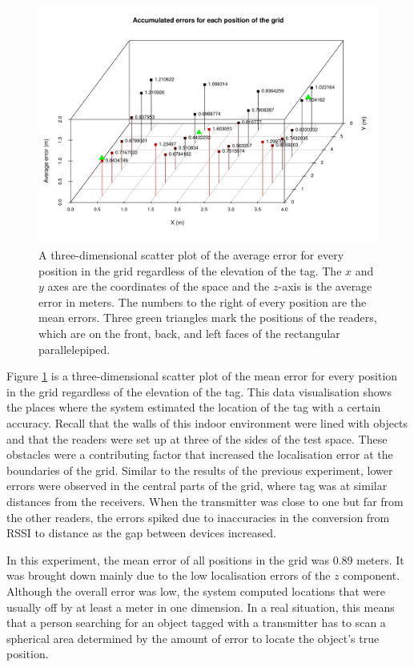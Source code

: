 \begin{figure}[H]
	\begin{center}
		\includegraphics[width=1\textwidth]{figures/tall2}
		\caption{A three-dimensional scatter plot of the average error for every position in the grid regardless of the elevation of the tag. The $x$ and $y$ axes are the coordinates of the space and the $z$-axis is the average error in meters. The numbers to the right of every position are the mean errors. Three green triangles mark the positions of the readers, which are on the front, back, and left faces of the rectangular parallelepiped.}
		\label{fig:errortall}
	\end{center}
\end{figure}

Figure \ref{fig:errortall} is a three-dimensional scatter plot of the mean error for every position in the grid regardless of the elevation of the tag. This data visualisation shows the places where the system estimated the location of the tag with a certain accuracy. Recall that the walls of this indoor environment were lined with objects and that the readers were set up at three of the sides of the test space. These obstacles were a contributing factor that increased the localisation error at the boundaries of the grid. Similar to the results of the previous experiment, lower errors were observed in the central parts of the grid, where tag was at similar distances from the receivers. When the transmitter was close to one but far from the other readers, the errors spiked due to inaccuracies in the conversion from RSSI to distance as the gap between devices increased.

In this experiment, the mean error of all positions in the grid was 0.89 meters. It was brought down mainly due to the low localisation errors of the $z$ component. Although the overall error was low, the system computed locations that were usually off by at least a meter in one dimension. In a real situation, this means that a person searching for an object tagged with a transmitter has to scan a spherical area determined by the amount of error to locate the object's true position.

